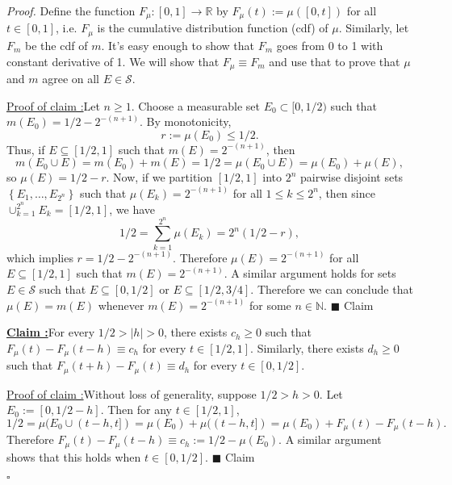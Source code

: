 \documentclass[12pt]{article}
\newcounter{ProofCounter}
\newcounter{ClaimCounter}[ProofCounter]
\newenvironment{Proof}{\stepcounter{ProofCounter}\textit{Proof.}}{\hfill$\square$}
\newenvironment{claim}[1]{\vspace{1mm}\stepcounter{ClaimCounter}\par\noindent\underline{\bf Claim \theClaimCounter:}\space#1}{}
\newenvironment{claimproof}[1]{\par\noindent\underline{Proof of claim \theClaimCounter:}\space#1}{\hfill $\blacksquare$ Claim \theClaimCounter}
\begin{document}
\begin{Proof}
Define the function $F_{\mu} : [0,1] \rightarrow \mathbb{R}$ by $F_{\mu}(t) := \mu([0,t])$ for all $t \in [0,1]$, i.e. $F_{\mu}$ is the 
cumulative distribution function (cdf) of $\mu$. Similarly, let $F_{m}$ be the cdf of $m$. It's easy enough to show that $F_{m}$ goes from 0 to 1 with
constant derivative of 1. We will show that $F_{\mu} \equiv F_{m}$ and use that to prove that $\mu$ and $m$ agree on all $E \in \mathcal{S}$.

\begin{claimproof}
Let $n \geq 1$. Choose a measurable set $E_{0} \subset [0,1/2)$ such that $m(E_{0}) = 1/2 - 2^{-(n+1)}$. By monotonicity,
\[ r := \mu(E_{0}) \leq 1/2. \]
Thus, if $E \subseteq [1/2,1]$ such that $m(E) = 2^{-(n+1)}$, then 
\[ m(E_{0} \cup E) = m(E_{0}) + m(E) = 1/2 = \mu(E_{0} \cup E) = \mu(E_{0}) + \mu(E), \] 
so $\mu(E) = 1/2 - r$. Now, if we partition $[1/2,1]$ into $2^{n}$ pairwise disjoint sets $\left\{ E_{1}, \hdots , E_{2^{n}} \right\}$ such that
$\mu(E_{k}) = 2^{-(n+1)}$ for all $1 \leq k \leq 2^{n}$, then since $\cup_{k=1}^{2^{n}}E_{k} = [1/2,1]$, we have 
\[ 1/2 = \sum_{k=1}^{2^{n}}\mu(E_{k}) = 2^{n}(1/2 - r), \]
which implies $r = 1/2 - 2^{-(n+1)}$. Therefore $\mu(E) = 2^{-(n+1)}$ for all $E \subseteq [1/2,1]$ such that $m(E) = 2^{-(n+1)}$. A similar argument
holds for sets $E \in \mathcal{S}$ such that $E \subseteq [0,1/2]$ or $E \subseteq [1/2,3/4]$. Therefore we can conclude that $\mu(E) = m(E)$ whenever
$m(E) = 2^{-(n+1)}$ for some $n \in \mathbb{N}$.
\end{claimproof}

\begin{claim}
For every $1/2 > |h|  > 0$, there exists $c_{h} \geq 0$ such that $F_{\mu}(t) - F_{\mu}(t - h) \equiv c_{h}$ for every $t \in
[1/2,1]$. Similarly, there exists $d_{h} \geq 0$ such that $F_{\mu}(t+h) - F_{\mu}(t) \equiv d_{h}$ for every $t \in [0,1/2]$.
\end{claim}
\begin{claimproof}
Without loss of generality, suppose $1/2 > h > 0$. 
Let $E_{0} := [0, 1/2 - h]$. Then for any $t \in [1/2,1]$,
\[ 1/2 = \mu(E_{0} \cup (t-h, t]) = \mu(E_{0}) + \mu( (t-h, t]) = \mu(E_{0}) + F_{\mu}(t) - F_{\mu}(t-h). \]
Therefore $F_{\mu}(t) - F_{\mu}(t-h) \equiv c_{h} := 1/2 - \mu(E_{0})$. A similar argument shows that this holds when $t \in [0,1/2]$.
\end{claimproof}


\end{Proof}
\end{document}
